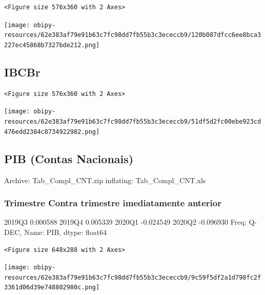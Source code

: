 \documentclass[11pt]{article}
\begin{document}
\begin{enumerate}
\begin{verbatim}
<Figure size 576x360 with 2 Axes>
\end{verbatim}


\begin{center}
\texttt{[image: obipy-resources/62e383af79e91b63c7fc98dd7fb55b3c3ececcb9/120b087dfcc6ee8bca3227ec45868b7327bde212.png]}
\end{center}
\end{enumerate}



\subsection{IBCBr}
\label{sec:org095ee82}

\begin{verbatim}
<Figure size 576x360 with 2 Axes>
\end{verbatim}


\begin{center}
\texttt{[image: obipy-resources/62e383af79e91b63c7fc98dd7fb55b3c3ececcb9/51df5d2fc00ebe923cd476edd2384c8734922982.png]}
\end{center}

\subsection{PIB (Contas Nacionais)}
\label{sec:orgf8c8987}

Archive:  Tab\_Compl\_CNT.zip
  inflating: Tab\_Compl\_CNT.xls       

\subsubsection{Trimestre Contra trimestre imediatamente anterior}
\label{sec:org0ac5918}

2019Q3    0.000588
2019Q4    0.005339
2020Q1   -0.024549
2020Q2   -0.096930
Freq: Q-DEC, Name: PIB, dtype: float64

\begin{verbatim}
<Figure size 648x288 with 2 Axes>
\end{verbatim}


\begin{center}
\texttt{[image: obipy-resources/62e383af79e91b63c7fc98dd7fb55b3c3ececcb9/9c59f5df2a1d798fc2f3361d06d39e748802980c.png]}
\end{center}
\end{document}
